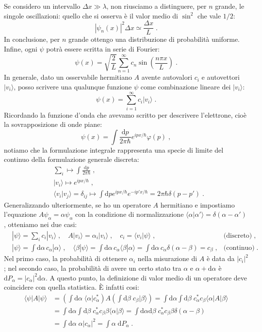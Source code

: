 \documentclass[10pt,a4paper]{report}
\theoremstyle{definition}
\numberwithin{equation}{section}
\newcommand{\diff}[1][]{\mathrm{d}#1}
\newcommand{\bra}{\langle}
\newcommand{\ket}{\rangle}
\begin{document}
Se considero un intervallo $\Delta x \gg \lambda$, non riusciamo a distinguere, per $n$ grande, le singole oscillazioni: quello che si osserva è il valor medio di $\sin^2$ che vale $1/2$:
$$
|\psi_n(x)|^2\Delta x \simeq \frac{\Delta x}{L}\;.
$$
In conclusione, per $n$ grande ottengo una distribuzione di probabilità uniforme. Infine, ogni $\psi$ potrà essere scritta in serie di Fourier:
\begin{equation}
\psi(x)=\sqrt{\frac{2}{L}}\sum_{n=1}^{\infty} c_n\sin\left(\frac{n\pi x}{L}\right)\;.
\end{equation}
In generale, dato un osservabile hermitiano $A$ avente autovalori $c_i$ e autovettori $|v_i\ket$, posso scrivere una qualunque funzione $\psi$ come combinazione lineare dei $|v_i\ket$:
$$
\psi(x)=\sum_{i=1}^{\infty} c_i|v_i\ket\;.
$$
Ricordando la funzione d'onda che avevamo scritto per descrivere l'elettrone, cioè la sovrapposizione di onde piane:
$$
\psi(x)=\int \frac{\diff{p}}{2\pi\hbar}e^{ipx/\hbar}\varphi(p)\;,
$$
notiamo che la formulazione integrale rappresenta una specie di limite del continuo della formulazione generale discreta:
\begin{align*}
&\sum_i \longmapsto\int\frac{\diff{p}}{2\pi\hbar}\;, \\
&|v_i\ket\longmapsto e^{ipx/\hbar}\;, \\
&\bra v_i|v_j\ket=\delta_{ij}\longmapsto \int\diff{p}e^{ipx/\hbar}e^{-ip'x/\hbar}=2\pi\hbar\delta(p-p')\;.
\end{align*}
Generalizzando ulteriormente, se ho un operatore $A$ hermitiano e impostiamo l'equazione $A\psi_{\alpha}=\alpha\psi_{\alpha}$ con la condizione di normalizzazione $\bra\alpha|\alpha'\ket=\delta(\alpha-\alpha')$, otteniamo nei due casi:
\begin{align*}
&|\psi\ket =\sum_i c_i|v_i\ket\;,\quad A|v_i\ket=\alpha_i|v_i\ket\;,\quad c_i=\bra v_i|\psi\ket\;,&\mbox{(discreto)}\;, \\
&|\psi\ket=\int\diff{\alpha}\,c_{\alpha}|\alpha\ket\;,\quad \bra\beta|\psi\ket=\int\diff{\alpha}\,c_{\alpha}\bra\beta|\alpha\ket=\int\diff{\alpha}\,c_{\alpha}\delta(\alpha-\beta)=c_{\beta}\;, &\mbox{(continuo)}\;.
\end{align*}
Nel primo caso, la probabilità di ottenere $\alpha_i$ nella misurazione di $A$ è data da $|c_i|^2$; nel secondo caso, la probabilità di avere un certo stato tra $\alpha$ e $\alpha+\diff{\alpha}$ è $\diff{P_{\alpha}}=|c_{\alpha}|^2\diff{\alpha}$. A questo punto, la definizione di valor medio di un operatore deve coincidere con quella statistica. È infatti cosi:
\begin{align*}
\bra\psi|A|\psi\ket &= \left(\int\diff{\alpha}\; \bra\alpha|c_{\alpha}^*\right)A\left(\int\diff{\beta}\;c_{\beta}|\beta\ket\right)=
\int\diff{\alpha}\int\diff{\beta}\;c_{\alpha}^* c_{\beta} \bra\alpha|A|\beta\ket \\
&= \int\diff{\alpha}\int\diff{\beta}\; c_{\alpha}^*c_{\beta}\beta \bra\alpha|\beta\ket=\int\diff{\alpha}\diff{\beta}\; c_{\alpha}^*c_{\beta}\beta\delta(\alpha-\beta) \\
&= \int \diff{\alpha}\;\alpha|c_{\alpha}|^2=\int \alpha\;\diff{P_{\alpha}}\;.
\end{align*}
\end{document}

